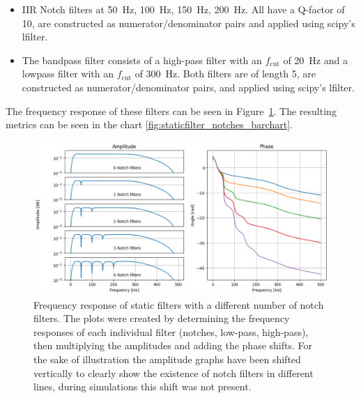 \begin{itemize}
    \item IIR Notch filters at \SI{50}{Hz}, \SI{100}{Hz}, \SI{150}{Hz}, \SI{200}{Hz}. All have a Q-factor of 10, are constructed as numerator/denominator pairs and applied using scipy's lfilter.
    \item The bandpass filter consists of a high-pass filter with an $f_\text{cut}$ of \SI{20}{Hz} and a lowpass filter with an $f_\text{cut}$ of \SI{300}{Hz}. Both filters are of length 5, are constructed as numerator/denominator pairs, and applied using scipy's lfilter.
\end{itemize}

The frequency response of these filters can be seen in Figure~\ref{fig:staticfilter_notches_frequencyresponse}. The resulting metrics can be seen in the chart \ref{fig:staticfilter_notches_barchart}.

\begin{figure}[h!t]
	\begin{center}
		\includegraphics[width=1.0\columnwidth]{images/staticfilter_notches_frequencyresponse.png}
	\end{center}
	\caption{Frequency response of static filters with a different number of notch filters. The plots were created by determining the frequency responses of each individual filter (notches, low-pass, high-pass), then multiplying the amplitudes and adding the phase shifts. For the sake of illustration the amplitude graphs have been shifted vertically to clearly show the existence of notch filters in different lines, during simulations this shift was not present. }
	\label{fig:staticfilter_notches_frequencyresponse}
\end{figure}


